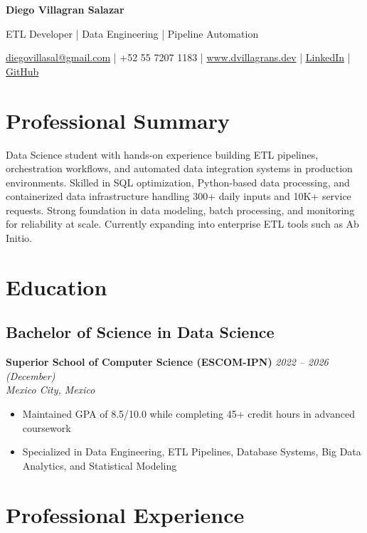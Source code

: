 \documentclass[7.5pt,a4paper]{article}
\newcommand{\name}[1]{\begin{center}\Large\bfseries\color{HarvardCrimson}#1\end{center}}
\newcommand{\tagline}[1]{\begin{center}\normalsize\color{DarkGray}#1\end{center}}
\newcommand{\contactinfo}[1]{\begin{center}\small\color{MediumGray}#1\end{center}}
\newcommand{\education}[4]{
\subsection*{#1}
\textbf{#2} \hfill \textit{#3} \\
\textit{#4}
}
\begin{document}
\name{Diego Villagran Salazar}
\tagline{ETL Developer | Data Engineering | Pipeline Automation}
\contactinfo{
\href{mailto:diegovillasal@gmail.com}{diegovillasal@gmail.com} | +52 55 7207 1183 | \href{https://www.dvillagrans.dev}{www.dvillagrans.dev} | \href{https://www.linkedin.com/in/dvillagrans}{LinkedIn} | \href{https://github.com/dvillagrans}{GitHub}
}

\vspace{0.01cm}

\section*{Professional Summary}
\small
Data Science student with hands-on experience building ETL pipelines, orchestration workflows, and automated data integration systems in production environments. Skilled in SQL optimization, Python-based data processing, and containerized data infrastructure handling 300+ daily inputs and 10K+ service requests. Strong foundation in data modeling, batch processing, and monitoring for reliability at scale. Currently expanding into enterprise ETL tools such as Ab Initio.

\vspace{0.01cm}

\section*{Education}
\education{Bachelor of Science in Data Science}{Superior School of Computer Science (ESCOM-IPN)}{2022 -- 2026 (December)}{Mexico City, Mexico}
\begin{itemize}
\item Maintained GPA of 8.5/10.0 while completing 45+ credit hours in advanced coursework
\item Specialized in Data Engineering, ETL Pipelines, Database Systems, Big Data Analytics, and Statistical Modeling
\end{itemize}

\section*{Professional Experience}
\end{document}
